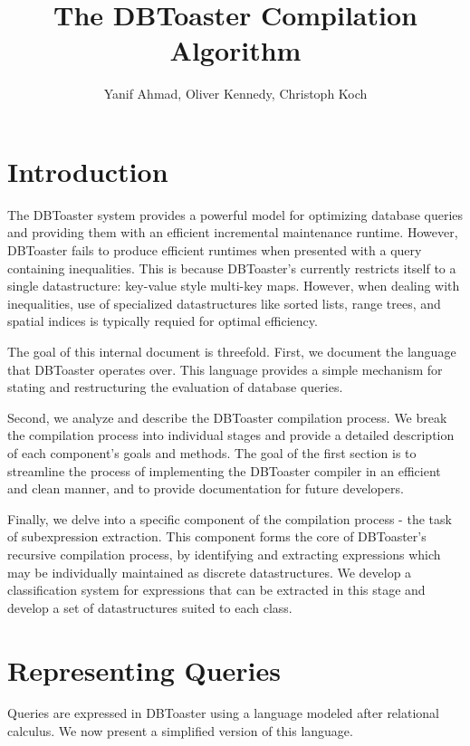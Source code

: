 \documentclass[11pt]{amsart}
\title{The DBToaster Compilation Algorithm}
\author{Yanif Ahmad, Oliver Kennedy, Christoph Koch}
\begin{document}
\maketitle

\section{Introduction}
The DBToaster system provides a powerful model for optimizing database queries and providing them with an efficient incremental maintenance runtime.  However, DBToaster fails to produce efficient runtimes when presented with a query containing inequalities.  This is because DBToaster's currently restricts itself to a single datastructure: key-value style multi-key maps.  However, when dealing with inequalities, use of specialized datastructures like sorted lists, range trees, and spatial indices is typically requied for optimal efficiency.

The goal of this internal document is threefold.  First, we document the language that DBToaster operates over.  This language provides a simple mechanism for stating and restructuring the evaluation of database queries. 

Second, we analyze and describe the DBToaster compilation process.  We break the compilation process into individual stages and provide a detailed description of each component's goals and methods.  The goal of the first section is to streamline the process of implementing the DBToaster compiler in an efficient and clean manner, and to provide documentation for future developers.

Finally, we delve into a specific component of the compilation process - the task of subexpression extraction.  This component forms the core of DBToaster's recursive compilation process, by identifying and extracting expressions which may be individually maintained as discrete datastructures.  We develop a classification system for expressions that can be extracted in this stage and develop a set of datastructures suited to each class.

\section{Representing Queries}
Queries are expressed in DBToaster using a language modeled after relational calculus.  We now present a simplified version of this language.
\end{document}
